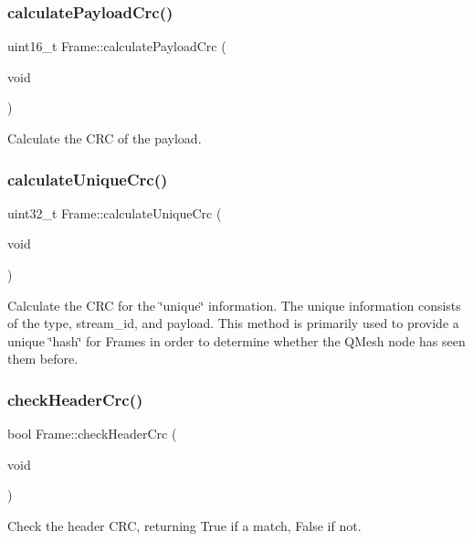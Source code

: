\subsubsection{\texorpdfstring{calculate\+Payload\+Crc()}{calculatePayloadCrc()}}
{\footnotesize\ttfamily uint16\+\_\+t Frame\+::calculate\+Payload\+Crc (\begin{DoxyParamCaption}\item[{void}]{ }\end{DoxyParamCaption})}

Calculate the C\+RC of the payload. \mbox{\label{classFrame_a0fe074218aa4420b0706eb699c7f7172}} 
\subsubsection{\texorpdfstring{calculate\+Unique\+Crc()}{calculateUniqueCrc()}}
{\footnotesize\ttfamily uint32\+\_\+t Frame\+::calculate\+Unique\+Crc (\begin{DoxyParamCaption}\item[{void}]{ }\end{DoxyParamCaption})}

Calculate the C\+RC for the \char`\"{}unique\char`\"{} information. The unique information consists of the type, stream\+\_\+id, and payload. This method is primarily used to provide a unique \char`\"{}hash\char`\"{} for Frames in order to determine whether the Q\+Mesh node has seen them before. \mbox{\label{classFrame_a34b08e2484da3872ea9e4de67d22be3e}} 
\subsubsection{\texorpdfstring{check\+Header\+Crc()}{checkHeaderCrc()}}
{\footnotesize\ttfamily bool Frame\+::check\+Header\+Crc (\begin{DoxyParamCaption}\item[{void}]{ }\end{DoxyParamCaption})\hspace{0.3cm}{\ttfamily [inline]}}

Check the header C\+RC, returning True if a match, False if not. \mbox{\label{classFrame_ac7d53c381360cbcddf3f11ef89281c32}} 
